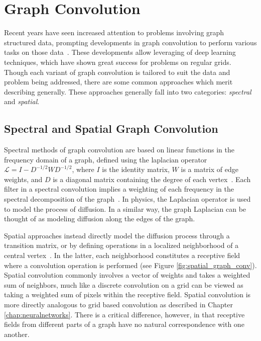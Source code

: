 \section{Graph Convolution}
Recent years have seen increased attention to problems involving graph structured data, prompting developments in graph convolution to perform various tasks on those data~\cite{bronstein2016}.
These developments allow leveraging of deep learning techniques, which have shown great success for problems on regular grids.
Though each variant of graph convolution is tailored to suit the data and problem being addressed, there are some common approaches which merit describing generally.
These approaches generally fall into two categories: \emph{spectral} and \emph{spatial}.


\subsection{Spectral and Spatial Graph Convolution}
Spectral methods of graph convolution are based on linear functions in the frequency domain of a graph, defined using the laplacian operator $\mathcal{L}=I-D^{-1/2}WD^{-1/2}$, where $I$ is the identity matrix, $W$ is a matrix of edge weights, and $D$ is a diagonal matrix containing the degree of each vertex~\cite{bruna2013, henaff2015, kipf2016}.
Each filter in a spectral convolution implies a weighting of each frequency in the spectral decomposition of the graph~\cite{mallat2009}.
In physics, the Laplacian operator is used to model the process of diffusion.
In a similar way, the graph Laplacian can be thought of as modeling diffusion along the edges of the graph.

Spatial approaches instead directly model the diffusion process through a transition matrix, or by defining operations in a localized neighborhood of a central vertex~\cite{henaff2015, atwood2016}.
In the latter, each neighborhood constitutes a receptive field where a convolution operation is performed (see Figure \ref{fig:spatial_graph_conv}).
Spatial convolution commonly involves a vector of weights and takes a weighted sum of neighbors, much like a discrete convolution on a grid can be viewed as taking a weighted sum of pixels within the receptive field.
Spatial convolution is more directly analogous to grid based convolution as described in Chapter \ref{chap:neuralnetworks}.
There is a critical difference, however, in that receptive fields from different parts of a graph have no natural correspondence with one another.

